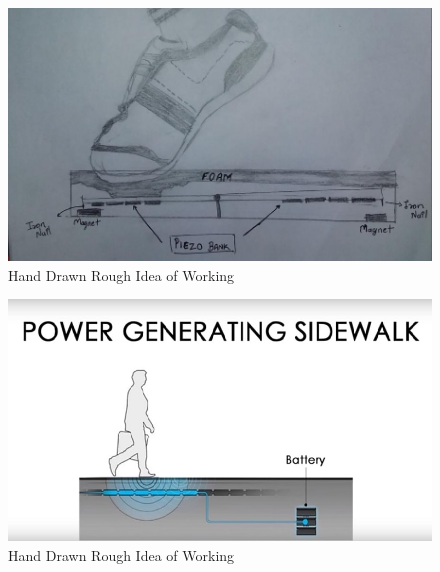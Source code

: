 \documentclass[11pt]{article}
\begin{document}
\begin{figure}[H]
	\centering
	\includegraphics[scale=0.5]{shoe.jpg}
	\caption{Hand Drawn Rough Idea of Working}
\end{figure}
\begin{figure}[H]
	\centering
	\includegraphics[scale=0.5]{walk.jpg}
	\caption{Hand Drawn Rough Idea of Working}
\end{figure}
\end{document}
